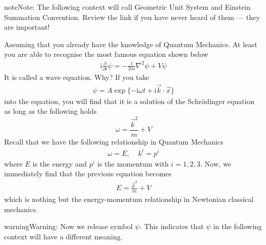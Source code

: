 \documentclass[letterpaper,10pt,english]{sphinxmanual}
\begin{document}
\begin{sphinxadmonition}{note}{Note:}
The following context will call Geometric Unit System and Einstein Summation Convention. Review the link if you have never heard of them — they are important!
\end{sphinxadmonition}

Assuming that you already have the knowledge of Quantum Mechanics. At least you are able to recognise the most famous equation shown below
\begin{equation*}
\begin{split}\mathrm{i}\frac{\partial}{\partial t}\psi = -\frac{1}{2m}\nabla^2\psi + V\psi\end{split}
\end{equation*}
It is called a wave equation. Why? If you take
\begin{equation*}
\begin{split}\psi = A\exp\{-\mathrm{i}\omega t + \mathrm{i}\vec k\cdot \vec x\}\end{split}
\end{equation*}
into the equation, you will find that it is a solution of the Schrödinger equation as long as the following holds
\begin{equation}
\omega = \frac{\vec k^2}{m} + V \label{difrel}
\end{equation}
Recall that we have the following relationship in Quantum Mechanics
\begin{equation*}
\begin{split}\omega = E,\ \ \ \ \  k^i = p^i\end{split}
\end{equation*}
where \(E\) is the energy and \(p^i\) is the momentum with \(i=1,2,3\). Now, we immediately find that the previous equation becomes
\begin{equation*}
\begin{split}E = \frac{\vec p^2}{m} + V\end{split}
\end{equation*}
which is nothing but the energy-momentum relationship in Newtonian classical mechanics.

\begin{sphinxadmonition}{warning}{Warning:}
Now we release symbol \(\psi\). This indicates that \(\psi\) in the following context will have a different meaning.
\end{sphinxadmonition}
\end{document}
